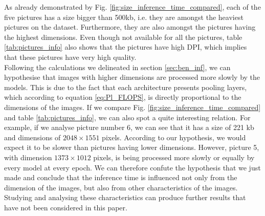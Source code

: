 As already demonstrated by Fig. \ref{fig:size_inference_time_compared}, each of the five pictures has a size bigger than 500kb, i.e. they are amongst the heaviest pictures on the dataset. Furthermore, they are also amongst the pictures having the highest dimensions. Even though not available for all the pictures, table \ref{tab:pictures_info} also shows that the pictures have high DPI, which implies that these pictures have very high quality. \\
Following the calculations we delineated in section \ref{sec:ben_inf}, we can hypothesise that images with higher dimensions are processed more slowly by the models. This is due to the fact that each architecture presents pooling layers, which according to equation \ref{eq:Pl_FLOPS}, is directly proportional to the dimensions of the images. If we compare Fig. \ref{fig:size_inference_time_compared} and table \ref{tab:pictures_info}, we can also spot a quite interesting relation.
For example, if we analyse picture number 6, we can see that it has a size of 221 kb and dimensions of $2048 \times 1551$ pixels. According to our hypothesis, we would expect it to be slower than pictures having lower dimensions. However, picture 5, with dimension $1373 \times 1012$ pixels, is being processed more slowly or equally by every model at every epoch. We can therefore confute the hypothesis that we just made and conclude that the inference time is influenced not only from the dimension of the images, but also from other characteristics of the images. Studying and analysing these characteristics can produce further results that have not been considered in this paper.


